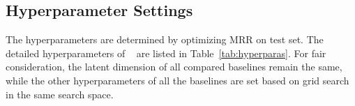 \begin{table}[t]
	\centering
	\caption{The hyperparameter settings of \score. $h$ is hidden vector size. $\eta$ is learning rate, $b$ is batch size.}\label{tab:hyperparas}
	\vspace{-10pt}
\end{table}

\subsection{Hyperparameter Settings}
The hyperparameters are determined by optimizing MRR on test set. The detailed hyperparameters of \score~ are listed in Table~\ref{tab:hyperparas}. For fair consideration, the latent dimension of all compared baselines remain the same, while the other hyperparameters of all the baselines are set based on grid search in the same search space.


